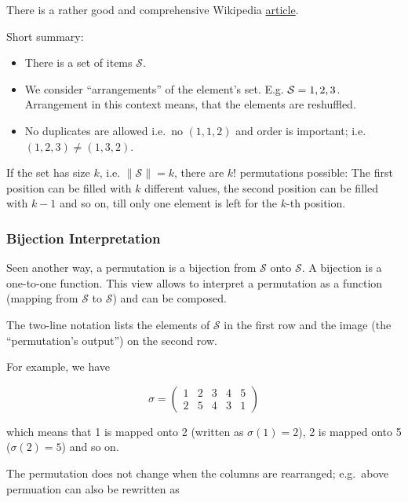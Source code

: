 
There is a rather good and comprehensive Wikipedia
\href{https://en.wikipedia.org/wiki/Permutation}{article}.

Short summary:

\begin{itemize}
\item
  There is a set of items \(\mathcal{S}\).
\item
  We consider ``arrangements'' of the element's set. E.g.
  \(\mathcal{S} = \\{1,2,3\\}\). Arrangement in this context means, that
  the elements are reshuffled.
\item
  No duplicates are allowed i.e.~no \((1,1,2)\) and order is important;
  i.e. \((1,2,3) \neq (1,3,2)\).
\end{itemize}

If the set has size \(k\), i.e. \(\|\mathcal{S}\| = k\), there are
\(k!\) permutations possible: The first position can be filled with
\(k\) different values, the second position can be filled with \(k-1\)
and so on, till only one element is left for the \(k\)-th position.

\subsubsection{Bijection Interpretation}

Seen another way, a permutation is a bijection from \(\mathcal{S}\) onto
\(\mathcal{S}\). A bijection is a one-to-one function. This view allows
to interpret a permutation as a function (mapping from \(\mathcal{S}\)
to \(\mathcal{S}\)) and can be composed.

The two-line notation lists the elements of \(\mathcal{S}\) in the first
row and the image (the ``permutation's output'') on the second row.

For example, we have

\[
\sigma=\begin{pmatrix}
1 & 2 & 3 & 4 & 5 \\
2 & 5 & 4 & 3 & 1\end{pmatrix}
\]

which means that 1 is mapped onto 2 (written as \(\sigma(1) = 2\)), 2 is
mapped onto 5 (\(\sigma(2) = 5\)) and so on.

The permutation does not change when the columns are rearranged;
e.g.~above permuation can also be rewritten as

